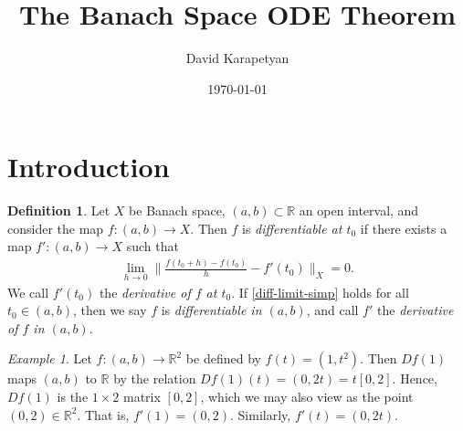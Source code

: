 \documentclass[12pt,reqno]{amsart}
\numberwithin{equation}{section}  %
\numberwithin{figure}{section}
\newcommand{\rr}{\mathbb{R}}
\theoremstyle{plain}
\theoremstyle{definition}
\newtheorem{definition}{Definition}
\theoremstyle{remark}
\newtheorem{example}{Example}
\begin{document}
\title{The Banach Space ODE Theorem}
\author{David Karapetyan}
\address{Department of Mathematics  \\
	University  of Notre Dame\\
		Notre Dame, IN 46556 }
		\date{\today}
		\maketitle
%
%
\section{Introduction}
\begin{definition}
	\label{def:diff-simp}
	Let $X$ be Banach space, $(a,b) \subset \rr$ an open interval, and
	consider the map $f: (a,b) \to X$.
	Then $f$ is \emph{differentiable at $t_0$} if there exists a map
	$f': (a,b) \to X$ such that 
	\begin{equation}
		\label{diff-limit-simp}
		\begin{split}
			\lim_{h \to 0} \| \frac{f(t_0+ h) - f(t_0) 
			 }{h} - f'(t_0) \|_X = 0.
		\end{split}
	\end{equation}
	We call $f'(t_0)$ the \emph{derivative of $f$ at $t_0$}.
	If \eqref{diff-limit-simp}
	holds for all $t_0 \in (a,b)$, then we say $f$ is \emph{differentiable in
	$(a,b)$}, and call $f'$ the
	\emph{derivative of $f$ in $(a,b)$}.  
\end{definition}
%
%
%
%
%
%
%
%
%
%
%
\begin{framed}
\begin{example}
Let $f: (a,b) \to \rr^2$ be defined by $f(t) = (1, t^2)$. Then $Df(1)$ maps
$(a,b)$ to $\rr$ by the relation $Df(1)(t) = (0, 2t) = t[0, 2]$. Hence, $Df(1)$ is the $1
\times 2$ matrix $[0,2]$, which we may also view as the point $(0,2) \in \rr^2$.
That is, $f'(1) = (0,2)$. Similarly, $f'(t) = (0,2t)$.
\end{example}
\end{framed}
\end{document}
